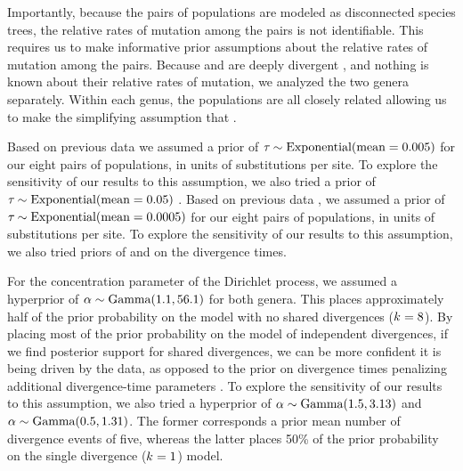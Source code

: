 Importantly, because the pairs of populations are modeled as disconnected
species trees, the relative rates of mutation among the pairs is not
identifiable.
This requires us to make informative prior assumptions about the relative rates
of mutation among the pairs.
Because  and  are deeply divergent
\citep[$>$ 80 mya;][]{Gamble2011},
and nothing is known about their relative rates of mutation, we analyzed the
two genera separately.
Within each genus, the populations are all closely related
\citep{Siler2010, Siler2012, Siler2014kikuchii, Welton2010zootaxa, Welton2010}
allowing us to
make the simplifying assumption that .

Based on previous data \citep{Siler2010, Welton2010zootaxa, Welton2010} we
assumed a prior  of
$\tau_{} \sim \textrm{Exponential}(\textrm{mean} = 0.005)$
 for
our eight pairs of  populations, in units of substitutions
per site.
To explore the sensitivity of our results to this assumption, we also
tried a prior  of
$\tau_{} \sim \textrm{Exponential}(\textrm{mean} = 0.05)$
.
Based on previous data \citep{Siler2012, Siler2014kikuchii}, we assumed a
 prior of
$\tau_{} \sim \textrm{Exponential}(\textrm{mean} = 0.0005)$ 
for our eight pairs of 
populations, in units of substitutions per site.
To explore the sensitivity of our results to this assumption, we also tried
priors of  and  on the 
divergence times.

For the concentration parameter of the Dirichlet process, we assumed
a hyperprior of $\alpha \sim \textrm{Gamma}(1.1, 56.1)$ for both genera.
This places approximately half of the prior probability on the model
with no shared divergences ($k_{} = 8$).
By placing most of the prior probability on the model of independent
divergences, if we find posterior support for shared divergences, we can be
more confident it is being driven by the data,
as opposed to the prior on divergence times penalizing additional
divergence-time parameters
\citep{Jeffreys1939,Lindley1957,Oaks2012,Oaks2014reply}.
To explore the sensitivity of our results to this assumption, we also
tried a hyperprior of
$\alpha \sim \textrm{Gamma}(1.5, 3.13)$
and
$\alpha \sim \textrm{Gamma}(0.5, 1.31)$.
The former corresponds  a prior mean number of divergence events of five,
whereas the latter places 50\% of the prior probability on the single
divergence ($k_{} = 1$) model.

